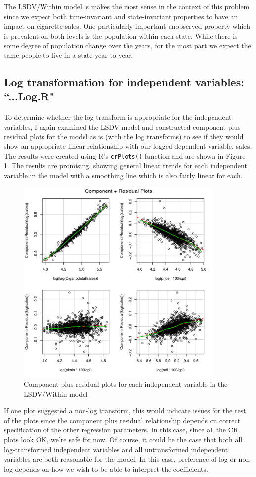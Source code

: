 \documentclass{article}
\begin{document}
The LSDV/Within model is makes the most sense in the context of this problem since we expect both time-invariant and state-invariant properties to have an impact on cigarette sales. One particularly important unobserved property which is prevalent on both levels is the population within each state. While there is some degree of population change over the years, for the most part we expect the same people to live in a state year to year. 

\subsection{Log transformation for independent variables: ``...Log.R"}
To determine whether the log transform is appropriate for the independent variables, I again examined the LSDV model and constructed component plus residual plots for the model as is (with the log transforms) to see if they would show an appropriate linear relationship with our logged dependent variable, sales. The results were created using R's \verb|crPlots()| function and are shown in Figure \ref{caplets}. The results are promising, showing general linear trends for each independent variable in the model with a smoothing line which is also fairly linear for each.

\begin{figure}[H]
\centering
\includegraphics[width = 4in]{figures/CR.pdf}
\caption{Component plus residual plots for each independent variable in the LSDV/Within model}
\label{caplets}
\end{figure}

If one plot suggested a non-log transform, this would indicate issues for the rest of the plots since the component plus residual relationship depends on correct specification of the other regression parameters. In this case, since all the CR plots look OK, we're safe for now. Of course, it could be the case that both all log-transformed independent variables and all untransformed independent variables are both reasonable for the model. In this case, preference of log or non-log depends on how we wish to be able to interpret the coefficients.
\end{document}
